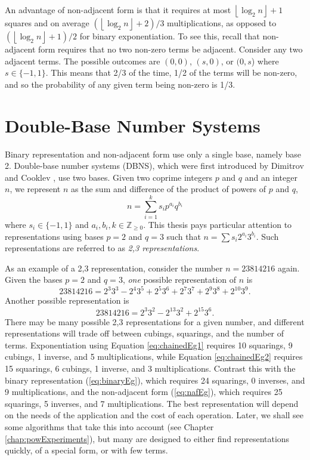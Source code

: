 \documentclass{ucalgthes1}
\theoremstyle{definition}
\newcommand{\ZZgez}{\mathbb{Z}_{\ge 0}}
\newcommand{\floor}[1]{\left\lfloor #1 \right\rfloor}
\begin{document}
An advantage of non-adjacent form is that it requires at most $\floor{\log_2 n}+1$ squares and on average $(\floor{\log_2 n}+2)/3$ multiplications, as opposed to $(\floor{\log_2 n}+1)/2$ for binary exponentiation.  To see this, recall that non-adjacent form requires that no two non-zero terms be adjacent.  Consider any two adjacent terms.  The possible outcomes are $(0,0)$, $(s, 0)$, or $(0, s$) where $s \in \{-1, 1\}$. This means that 2/3 of the time, 1/2 of the terms will be non-zero, and so the probability of any given term being non-zero is 1/3.


\section{Double-Base Number Systems}
\label{sec:dbns}

Binary representation and non-adjacent form use only a single base, namely base 2.  Double-base number systems (DBNS), which were first introduced by Dimitrov and Cooklev \cite{Dimitrov1995a, Dimitrov1995b}, use two bases.  Given two coprime integers $p$ and $q$ and an integer $n$, we represent $n$ as the sum and difference of the product of powers of $p$ and $q$,
\begin{equation}\label{eq:generalDbnsForm}
	n = \sum_{i=1}^k s_i p^{a_i} q^{b_i}
\end{equation}
where $s_i \in \{-1, 1\}$ and $a_i, b_i, k \in \ZZgez$. This thesis pays particular attention to representations using bases $p=2$ and $q=3$ such that $n = \sum s_i 2^{a_i} 3^{b_i}$.  Such representations are referred to as \emph{2,3 representations}.

As an example of a 2,3 representation, consider the number $n=23814216$ again.  Given the bases $p=2$ and $q=3$, \emph{one} possible representation of $n$ is
\begin{equation}
\label{eq:chainedEg1}
	23814216 = 2^3 3^3 - 2^4 3^5 + 2^5 3^6  + 2^7 3^7 + 2^9 3^8 + 2^{10} 3^9.
\end{equation}
Another possible representation is
\begin{equation}
\label{eq:chainedEg2}
	23814216 = 2^3 3^2 -2^{13} 3^2 +2^{15} 3^6.
\end{equation}
There may be many possible 2,3 representations for a given number, and different representations will trade off between cubings, squarings, and the number of terms.  Exponentiation using Equation \ref{eq:chainedEg1} requires 10 squarings, 9 cubings, 1 inverse, and 5 multiplications, while Equation \ref{eq:chainedEg2} requires 15 squarings, 6 cubings, 1 inverse, and 3 multiplications.  Contrast this with the binary representation (\ref{eq:binaryEg}), which requires 24 squarings, 0 inverses, and 9 multiplications, and the non-adjacent form (\ref{eq:nafEg}), which requires 25 squarings, 5 inverses, and 7 multiplications.  The best representation will depend on the needs of the application and the cost of each operation.  Later, we shall see some algorithms that take this into account (see Chapter \ref{chap:powExperiments}), but many are designed to either find representations quickly, of a special form, or with few terms.
\end{document}
